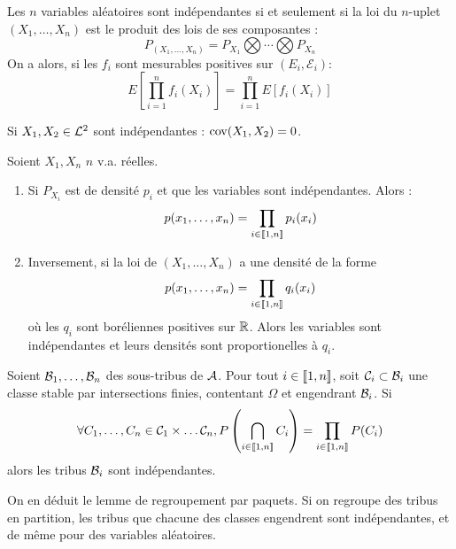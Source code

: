 \documentclass{cours}
\begin{document}
            \begin{theorem}
                Les $n$ variables aléatoires sont indépendantes si et seulement si la loi du $n$-uplet $\left(X_{1}, \ldots, X_{n}\right)$ est le produit des lois de ses composantes : 
                \[
                    P_{\left(X_{1}, \ldots, X_{n}\right)} = P_{X_{1}} \bigotimes \cdots \bigotimes P_{X_{n}}
                \]
                On a alors, si les $f_{i}$ sont mesurables positives sur $\left(E_{i}, \mathcal{E}_{i}\right)$: 
                \[
                    E\left[\prod_{i = 1}^{n}f_{i}(X_{i})\right] = \prod_{i = 1}^{n} E\left[f_{i}(X_{i})\right]
                \]
            \end{theorem}
            \begin{corollary}
                Si $X_{1}, X_{2} \in \mathcal{L}^{2}$ sont indépendantes : $\operatorname{cov}(X_{1}, X_{2}) = 0$.
            \end{corollary}

            \begin{corollary}
                Soient $X_{1}, X_{n}$ $n$ v.a. réelles.
                \begin{enumerate}
                    \item Si $P_{X_{i}}$ est de densité $p_{i}$ et que les variables sont indépendantes. Alors : 
                    \[p(x_{1}, \ldots, x_{n}) = \prod_{i\in \left\llbracket 1, n\right\rrbracket} p_{i}(x_{i})\]
                    \item Inversement, si la loi de $\left(X_{1}, \ldots, X_{n}\right)$ a une densité de la forme \[p(x_{1}, \ldots, x_{n}) = \prod_{i\in \left\llbracket 1, n\right\rrbracket} q_{i}(x_{i})\] où les $q_{i}$ sont boréliennes positives sur $\mathbb{R}$. Alors les variables sont indépendantes et leurs densités sont proportionelles à $q_{i}$.
                \end{enumerate}
            \end{corollary}

            \begin{proposition}
                Soient $\mathcal{B}_{1}, \ldots, \mathcal{B}_{n}$ des sous-tribus de $\mathcal{A}$. Pour tout $i\in \left\llbracket 1, n\right\rrbracket$, soit $\mathcal{C}_{i} \subset \mathcal{B}_{i}$ une classe stable par intersections finies, contentant $\Omega$ et engendrant $\mathcal{B}_{i}$. Si 
                \[
                    \forall C_{1}, \ldots, C_{n} \in \mathcal{C}_{1} \times \ldots \mathcal{C}_{n}, P\left(\bigcap_{i \in \left\llbracket 1, n\right\rrbracket} C_{i}\right) = \prod_{i \in \left\llbracket 1, n\right\rrbracket}P(C_{i})
                \]
                alors les tribus $\mathcal{B}_{i}$ sont indépendantes.
            \end{proposition}
            \begin{corollary}
                On en déduit le lemme de regroupement par paquets. Si on regroupe des tribus en partition, les tribus que chacune des classes engendrent sont indépendantes, et de même pour des variables aléatoires. 
            \end{corollary}
            
\end{document}
